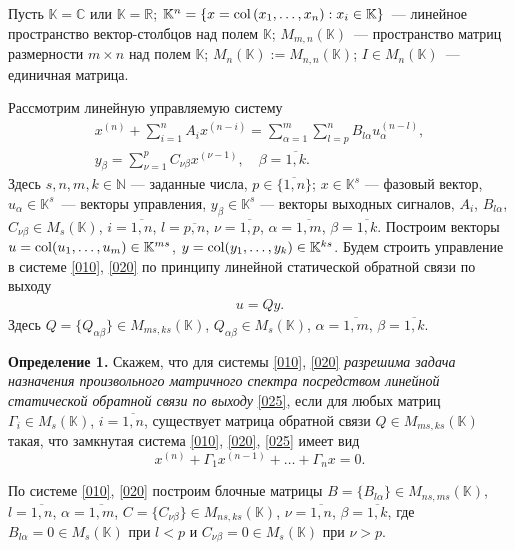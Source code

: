 Пусть $\mathbb{K}=\mathbb{C}$ или $\mathbb{K}=\mathbb{R}$; $\mathbb{K}^n=\{x={\rm col}\,(x_1,\ldots,x_n): x_i\in\mathbb{K}\}$~--- линейное пространство вектор-столбцов над полем $\mathbb{K}$; $M_{m,n}(\mathbb{K})$~--- пространство матриц размерности $m\times n$ над полем $\mathbb{K}$; $M_n(\mathbb{K}):=M_{n,n}(\mathbb{K})$; $I\in M_n(\mathbb{K})$~--- единичная матрица.

Рассмотрим линейную управляемую систему \cite{LAIA}
\begin{gather}\label{010}
x^{(n)}+\sum\limits_{i=1}^n
A_{i}x^{(n-i)}=\sum\limits_{\alpha=1}^m\sum\limits_{l=p}^n
B_{l\alpha}u_{\alpha}^{(n-l)},\\
\label{020}
 y_{\beta}=\sum\limits_{\nu=1}^p C_{\nu \beta}x^{(\nu-1)},\quad
\beta=\overline{1,k}.
\end{gather}
Здесь $s,n,m,k\in\mathbb{N}$ --- заданные числа, $p\in\{\overline{1,n}\}$;
$x\in\mathbb{K}^s$ --- фазовый вектор,
$u_{\alpha}\in\mathbb{K}^s$~--- векторы управления,
$y_{\beta}\in\mathbb{K}^s$ --- векторы выходных сигналов, $A_i$,
$B_{l\alpha}$, $C_{\nu\beta}\in M_{s}(\mathbb{K})$, $i=\overline{1,n}$,
$l=\overline{p,n}$, $\nu=\overline{1,p}$, $\alpha=\overline{1,m}$,
$\beta=\overline{1,k}$. Построим векторы $u={\rm
col}(u_1,\ldots,u_m)\in\mathbb{K}^{ms}$, $y={\rm
col}(y_1,\ldots,y_k)\in\mathbb{K}^{ks}$. 
Будем строить управление в системе \eqref{010}, \eqref{020} по принципу линейной статической обратной связи по выходу
\begin{gather}\label{025}
u=Qy.
\end{gather}
Здесь $Q=\{Q_{\alpha\beta}\}\in M_{ms,ks}(\mathbb{K})$,
$Q_{\alpha\beta}\in M_s(\mathbb{K})$, $\alpha=\overline{1,m}$,
$\beta=\overline{1,k}$.


{\bf Определение 1.} Скажем, что для системы
\eqref{010}, \eqref{020} {\it разрешима задача назначения
произвольного матричного спектра посредством линейной статической
обратной связи по выходу} \eqref{025}, если для любых матриц
$\Gamma_i\in M_s(\mathbb{K})$, $i=\overline{1,n}$, существует
матрица обратной связи $Q\in M_{ms,ks}(\mathbb{K})$ такая, что
замкнутая система \eqref{010}, \eqref{020}, \eqref{025}
имеет вид 
\begin{equation*}\label{53-050}
x^{(n)}+\Gamma_{1}x^{(n-1)}+ \ldots  + \Gamma_{n}x  = 0.
\end{equation*}

По системе \eqref{010}, \eqref{020} построим блочные матрицы $B=\{B_{l\alpha}\}\in
M_{ns,ms}(\mathbb{K})$, $l=\overline{1,n}$, $\alpha=\overline{1,m}$,
$C=\{C_{\nu \beta}\}\in M_{ns,ks}(\mathbb{K})$, $\nu=\overline{1,n}$,
$\beta=\overline{1,k}$, где $B_{l\alpha}=0\in
M_s(\mathbb{K})$ при $l<p$ и $C_{\nu \beta}=0\in
M_s(\mathbb{K})$ при
$\nu>p$. 

